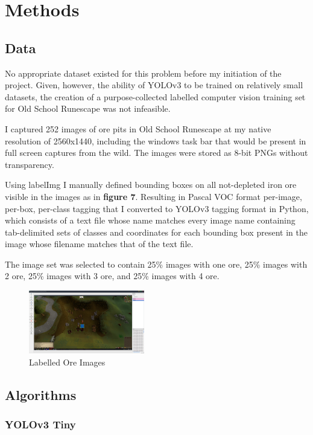 \documentclass[sigconf]{acmart}
\begin{document}
\section{Methods}

\subsection{Data}

No appropriate dataset existed for this problem before my initiation of the project. Given, however, the ability of YOLOv3 to be trained on relatively small datasets, the creation of a purpose-collected labelled computer vision training set for Old School Runescape was not infeasible.

I captured 252 images of ore pits in Old School Runescape at my native resolution of 2560x1440, including the windows task bar that would be present in full screen captures from the wild. The images were stored as 8-bit PNGs without transparency.

Using labelImg I manually defined bounding boxes on all not-depleted iron ore visible in the images as in \textbf{figure 7}.\cite{Label} Resulting in Pascal VOC format per-image, per-box, per-class tagging that I converted to YOLOv3 tagging format in Python, which consists of a text file whose name matches every image name containing tab-delimited sets of classes and coordinates for each bounding box present in the image whose filename matches that of the text file.

The image set was selected to contain 25\% images with one ore, 25\% images with 2 ore, 25\% images with 3 ore, and 25\% images with 4 ore.

\begin{figure}
  \includegraphics[width=0.45\textwidth]{labelled.png}
  \caption{Labelled Ore Images}
  \label{fig:iterchart}
\end{figure}

\subsection{Algorithms}
\subsubsection{YOLOv3 Tiny}
\end{document}
